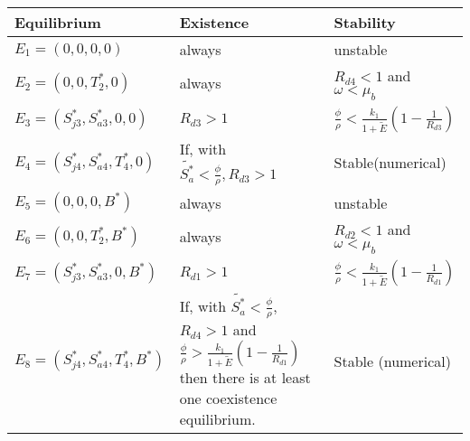 \setlength{\arrayrulewidth}{.5mm}
\setlength{\tabcolsep}{18pt}
\renewcommand{\arraystretch}{1.5}

{\tiny\hspace{-.5cm}\begin{tabular}{ |p{7cm}|p{7cm}|p{7cm}|}
\hline
Equilibrium & Existence & Stability \\
\hline
$E_1= (0,0,0,0)$ & always & unstable\\

$E_2= (0,0,T_2^*,0)$ & always & $R_{d4} < 1$ and $\omega<\mu_b$ \\

$E_3= (S_{j3}^*, S_{a3}^*, 0,0)$ & $R_{d3} > 1$ & $\displaystyle\frac {\phi}{\rho}<\displaystyle\frac{k_1}{1+\tilde{E}}\left(1-\displaystyle\frac{1}{R_{d3}}\right) $ \\

$E_4= (S_{j4}^*, S_{a4}^*, T_4^*, 0)$ & If, with $\tilde{S_a^*} < \displaystyle\frac{\phi}{\rho}, R_{d3} > 1$& Stable(numerical)\\

$E_5= (0,0,0,B^*)$ & always & unstable\\

$E_6= (0,0,T_2^*, B^*)$ & always & $R_{d2} < 1$ and $\omega<\mu_b$ \\

$E_7= (S_{j3}^*, S_{a3}^*, 0, B^*)$ & $ R_{d1} > 1$ & $\displaystyle\frac {\phi}{\rho}<\displaystyle\frac{k_1}{1+\tilde{E}}\left(1-\displaystyle\frac{1}{R_{d1}}\right) $ \\

$E_8=(S_{j4}^*,S_{a4}^*,T_4^*,B^*)$ & If, with $\tilde{S_a^*} < \frac{\phi}{\rho}$,$R_{d4} > 1$ and $\displaystyle\frac{\phi}{\rho} > \displaystyle\frac{k_1}{1+\tilde{E}}\left(1-\frac{1}{R_{d1}}\right)$ then there is at least one coexistence equilibrium. & Stable (numerical) \\

\hline

\end{tabular}}